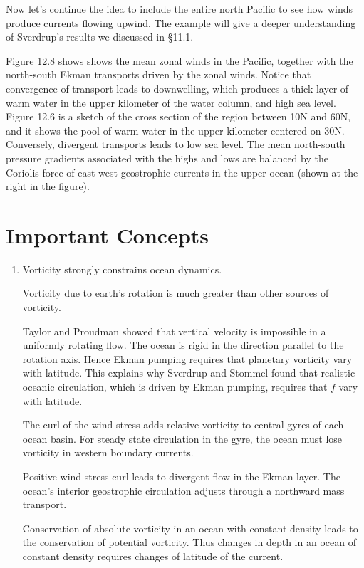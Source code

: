 Now let's continue the idea to include the entire north Pacific to see
how winds produce currents flowing upwind. The example will give a
deeper understanding of Sverdrup's results we discussed in \S11.1.

Figure 12.8 shows shows the mean zonal winds in the Pacific, together
with the north-south Ekman transports
driven by the zonal winds. Notice that convergence of
transport leads to downwelling, which
produces a thick layer of warm water in the upper kilometer of the
water column, and high sea level.  Figure 12.6 is a sketch of the
cross section of the region between 10\degrees N and 60\degrees N, and
it shows the pool of warm water in the upper kilometer centered on
30\degrees N.  Conversely, divergent transports leads to low sea
level. The mean north-south pressure gradients associated with the
highs and lows are balanced by the Coriolis force of east-west
geostrophic currents in the
upper ocean (shown at the right in the figure).

\section{Important Concepts}
\begin{enumerate}
\item Vorticity strongly constrains ocean dynamics.

\vitem Vorticity due to earth's rotation is much greater than other
sources of vorticity.

\vitem Taylor and Proudman showed that vertical velocity is impossible
in a uniformly rotating flow. The ocean is rigid in the direction
parallel to the rotation axis. Hence Ekman pumping requires that planetary vorticity vary with latitude. This
explains why Sverdrup and Stommel found that realistic oceanic
circulation, which is driven by Ekman pumping, requires that $f$ vary
with latitude.

\vitem The curl of the wind stress adds
relative vorticity to central gyres of each ocean basin. For steady
state circulation in the gyre, the ocean must lose vorticity in
western boundary currents.

\vitem Positive wind stress curl leads to divergent flow in the Ekman
layer.  The ocean's interior geostrophic circulation adjusts through a
northward mass transport.

\vitem Conservation of absolute vorticity in an ocean with constant
density leads to the conservation of potential vorticity. Thus changes
in depth in an ocean of constant density requires changes of latitude
of the current.

\end{enumerate}


